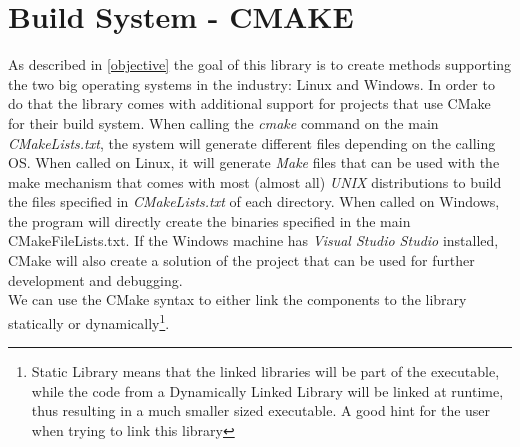 \section{Build System - CMAKE}
As described in \ref{objective} the goal of this library is to create methods supporting the two big operating systems in the industry: Linux and Windows. In order to do that the library comes with additional support for projects that use CMake for their build system. When calling the \textit{cmake} command on the main \textit{CMakeLists.txt}, the system will generate different files depending on the calling OS. When called on Linux, it will generate \textit{Make} files that can be used with the make mechanism that comes with most (almost all) \textit{UNIX} distributions to build the files specified in \textit{CMakeLists.txt} of each directory. When called on Windows, the program will directly create the binaries specified in the main CMakeFileLists.txt. If the Windows machine has \textit{Visual Studio Studio} installed, CMake will also create a solution of the project that can be used for further development and debugging.\\
We can use the CMake syntax to either link the components to the library statically or dynamically\footnote{Static Library means that the linked libraries will be part of the executable, while the code from a Dynamically Linked Library will be linked at runtime, thus resulting in a much smaller sized executable. A good hint for the user when trying to link this library}. 
